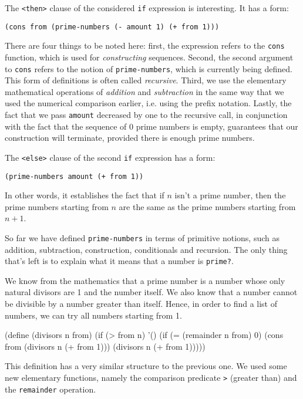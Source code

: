 The \texttt{<then>} clause of the considered \texttt{if} expression
is interesting. It has a form:

\texttt{(cons from (prime-numbers (- amount 1) (+ from 1)))}

There are four things to be noted here: first, the expression
refers to the \texttt{cons} function, which is used for
\textit{constructing} sequences. Second, the second argument
to \texttt{cons} refers to the notion of \texttt{prime-numbers},
which is currently being defined.
This form of definitions is often called \textit{recursive}. Third,
we use the elementary mathematical operations of \textit{addition}
and \textit{subtraction} in the same way that we used the numerical
comparison earlier, i.e. using the prefix notation. Lastly, the
fact that we pass \texttt{amount} decreased by one to the recursive
call, in conjunction with the fact that the sequence of 0 prime
numbers is empty, guarantees that our construction will terminate,
provided there is enough prime numbers.

The \texttt{<else>} clause of the second \texttt{if} expression
has a form:

\texttt{(prime-numbers amount (+ from 1))}

In other words, it establishes the fact that if $n$ isn't
a prime number, then the prime numbers starting from $n$ are
the same as the prime numbers starting from $n+1$.

So far we have defined \texttt{prime-numbers} in terms of primitive
notions, such as addition, subtraction, construction, conditionals
and recursion. The only thing that's left is to explain what it means
that a number is \texttt{prime?}.

We know from the mathematics that a prime number is a number whose
only natural divisors are 1 and the number itself. We also know
that a number cannot be divisible by a number greater than itself.
Hence, in order to find a list of numbers, we can try all numbers
starting from 1.

\begin{Snippet}
(define (divisors n from)
  (if (> from n)
    '()
    (if (= (remainder n from) 0)
      (cons from (divisors n (+ from 1)))
      (divisors n (+ from 1)))))
\end{Snippet}

This definition has a very similar structure to the previous one.
We used some new elementary functions, namely the comparison predicate
\texttt{>} (greater than) and the \texttt{remainder} operation.

